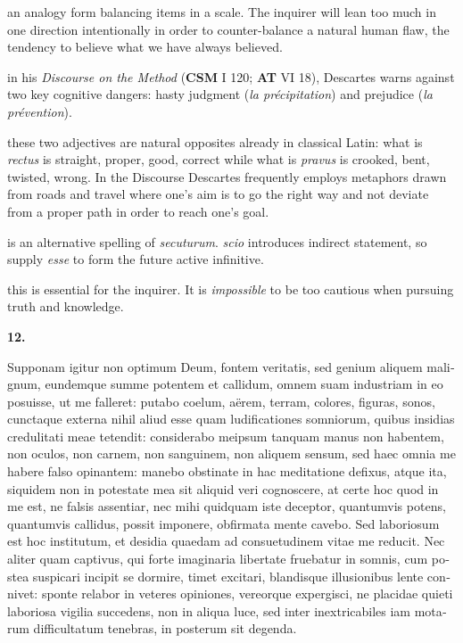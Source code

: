  an analogy form balancing items in a scale. The inquirer will lean too much in one direction intentionally in order to counter-balance a natural human flaw, the tendency to believe what we have always believed.

 in his \textit{Discourse on the Method} (\textbf{CSM} I 120; \textbf{AT} VI 18), Descartes warns against two key cognitive dangers: hasty judgment (\textit{la précipitation}) and prejudice (\textit{la prévention}).

 these two adjectives are natural opposites already in classical Latin: what is \textit{rectus} is straight, proper, good, correct while what is \textit{pravus} is crooked, bent, twisted, wrong.  In the {Discourse} Descartes frequently employs metaphors drawn from roads and travel where one's aim is to go the right way and not deviate from a proper path in order to reach one's goal.

 is an alternative spelling of \textit{secuturum}. \textit{scio} introduces indirect statement, so supply \textit{esse} to form the future active infinitive.

 this is essential for the inquirer. It is \textit{impossible} to be too cautious when pursuing truth and knowledge.

\clearpage

\beginnumbering
\pstart
\textbf{12.} \begin{latin}Supponam igitur non optimum Deum, fontem veritatis, sed genium aliquem malignum, eundemque summe potentem et callidum, omnem suam industriam in eo posuisse, ut me falleret: putabo coelum, aërem, terram, colores, figuras, sonos, cunctaque externa nihil aliud esse quam ludificationes somniorum, quibus insidias credulitati meae tetendit: considerabo meipsum tanquam manus non habentem, non oculos, non carnem, non sanguinem, non aliquem sensum, sed haec omnia me habere falso opinantem: manebo obstinate in hac meditatione defixus, atque ita, siquidem non in potestate mea sit aliquid veri cognoscere, at certe hoc quod in me est, ne falsis assentiar, nec mihi quidquam iste deceptor, quantumvis potens, quantumvis callidus, possit imponere, obfirmata mente cavebo. Sed laboriosum est hoc institutum, et desidia quaedam ad consuetudinem vitae me reducit. Nec aliter quam captivus, qui forte imaginaria libertate fruebatur in somnis, cum postea suspicari incipit se dormire, timet excitari, blandisque illusionibus lente connivet:  sponte relabor in veteres opiniones, vereorque expergisci, ne placidae quieti laboriosa vigilia succedens, non in aliqua luce, sed inter inextricabiles iam motarum difficultatum tenebras, in posterum sit degenda.\end{latin}
\pend
\endnumbering

